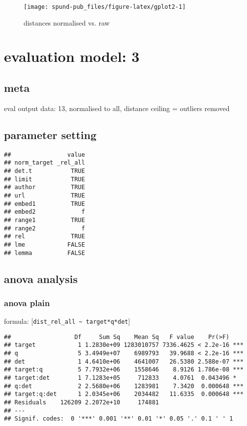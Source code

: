 \documentclass[
  12pt,
  oneside]{book}
\begin{document}
\begin{figure}[H]
\texttt{[image: spund-pub\_files/figure-latex/gplot2-1]} \caption{distances normalised vs. raw}\label{fig:gplot2}
\end{figure}

\section{evaluation model: 3}\label{evaluation-model-3}

\subsection{meta}\label{meta-2}

eval output data: 13, normalised to all, distance ceiling = outliers removed

\subsection{parameter setting}\label{parameter-setting-2}

\begin{verbatim}
##                value
## norm_target _rel_all
## det.t           TRUE
## limit           TRUE
## author          TRUE
## url             TRUE
## embed1          TRUE
## embed2             f
## range1          TRUE
## range2             f
## rel             TRUE
## lme            FALSE
## lemma          FALSE
\end{verbatim}

\subsection{anova analysis}\label{anova-analysis-2}

\subsubsection{anova plain}\label{anova-plain-2}

formula: {[}\texttt{dist\_rel\_all\ \textasciitilde{}\ target*q*det}{]}

\begin{verbatim}
##                  Df     Sum Sq    Mean Sq   F value    Pr(>F)    
## target            1 1.2830e+09 1283010757 7336.4625 < 2.2e-16 ***
## q                 5 3.4949e+07    6989793   39.9688 < 2.2e-16 ***
## det               1 4.6410e+06    4641007   26.5380 2.588e-07 ***
## target:q          5 7.7932e+06    1558646    8.9126 1.786e-08 ***
## target:det        1 7.1283e+05     712833    4.0761  0.043496 *  
## q:det             2 2.5680e+06    1283981    7.3420  0.000648 ***
## target:q:det      1 2.0345e+06    2034482   11.6335  0.000648 ***
## Residuals    126209 2.2072e+10     174881                        
## ---
## Signif. codes:  0 '***' 0.001 '**' 0.01 '*' 0.05 '.' 0.1 ' ' 1
\end{verbatim}
\end{document}
